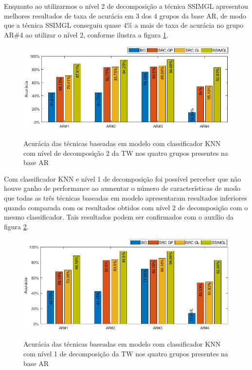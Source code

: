 Enquanto ao utilizarmos o nível 2 de decomposição  a técnica SSIMGL apresentou melhores resultados de taxa de acurácia em 3 dos 4 grupos da base AR, de modo que a técnica SSIMGL conseguiu quase 4\% a mais de taxa de acurácia no grupo AR\#4 ao utilizar o nível 2, conforme ilustra a figura \ref{fig:acuracia_modelo_KNN_nivel2}. 

\begin{figure}[H]
\centering
\caption{Acurácia das técnicas baseadas em modelo com classificador KNN com nível de decomposição 2 da TW nos quatro grupos presentes na base AR}
\includegraphics[scale=0.52]{imgs4/acuracia/nivel_one_two/knn_nivel2_modelo}
\label{fig:acuracia_modelo_KNN_nivel2}
\end{figure}


Com classificador KNN e nível 1 de decomposição foi possível perceber que não houve ganho de performance ao  aumentar o número de características de modo que todas as três técnicas baseadas em modelo apresentaram resultados inferiores quando comparada com os resultados obtidos com nível 2 de decomposição com o mesmo classificador. Tais resultados podem ser confirmados com o auxílio da figura \ref{fig:acuracia_modelo_KNN_nivel1}.


\begin{figure}[H]
\centering
\caption{Acurácia das técnicas baseadas em modelo com classificador KNN com nível 1 de decomposição da TW nos quatro grupos presentes na base AR}
\includegraphics[scale=0.52]{imgs4/acuracia/nivel_one_two/knn_nivel1_modelo}
\label{fig:acuracia_modelo_KNN_nivel1}
\end{figure}


